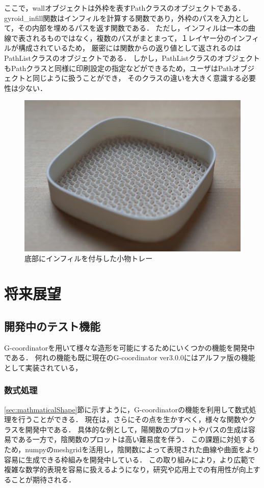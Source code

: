 \documentclass{article}
\begin{document}
\begin{twocolumn}
\begin{itemize}
ここで，wallオブジェクトは外枠を表すPathクラスのオブジェクトである．
gyroid\_infill関数はインフィルを計算する関数であり，外枠のパスを入力として，その内部を埋めるパスを返す関数である．
ただし，インフィルは一本の曲線で表されるものではなく，複数のパスがまとまって，１レイヤー分のインフィルが構成されているため，
厳密には関数からの返り値として返されるのはPathListクラスのオブジェクトである．
しかし，PathListクラスのオブジェクトもPathクラスと同様に印刷設定の指定などができるため，ユーザはPathオブジェクトと同じように扱うことができ，
そのクラスの違いを大きく意識する必要性は少ない．
\begin{figure}[htbp]
  \includegraphics[width=\linewidth]{img/infill_case.JPG}
  \caption{底部にインフィルを付与した小物トレー}
  \label{fig:infill}
\end{figure}

\section{将来展望}
\subsection{開発中のテスト機能}
G-coordinatorを用いて様々な造形を可能にするためにいくつかの機能を開発中である．
何れの機能も既に現在のG-coordinator ver3.0.0にはアルファ版の機能として実装されている，
\subsubsection{数式処理}
\ref{sec:mathmaticalShape}節に示すように，G-coordinatorの機能を利用して数式処理を行うことができる．
現在は，さらにその点を生かすべく，様々な関数やクラスを開発中である．
具体的な例として，陽関数のプロットやパスの生成は容易である一方で，陰関数のプロットは高い難易度を伴う．
この課題に対処するため，numpyのmeshgridを活用し，陰関数によって表現された曲線や曲面をより容易に生成できる枠組みを開発中している．
この取り組みにより，より広範で複雑な数学的表現を容易に扱えるようになり，研究や応用上での有用性が向上することが期待される．


\end{itemize}
\end{twocolumn}
\end{document}

